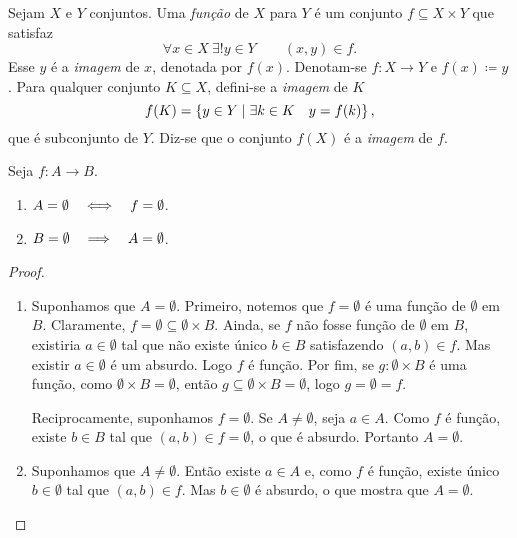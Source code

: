 \begin{defi}
Sejam $X$ e $Y$ conjuntos. Uma \emph{função} de $X$ para $Y$ é um conjunto $f \subseteq X \times Y$ que satisfaz
	\begin{equation*}
	\forall x \in X \ \exists! y \in Y \qquad (x,y) \in f.
	\end{equation*}
Esse $y$ é a \emph{imagem} de $x$, denotada por $f(x)$. Denotam-se $f: X \to Y$ e $f(x) \coloneqq y$. Para qualquer conjunto $K \subseteq X$, defini-se a \emph{imagem} de $K$
	\begin{equation*}
	f(K)=\left\{y \in Y \;\middle\vert\; \exists k \in K \quad y=f(k) \right\},
	\end{equation*}
que é subconjunto de $Y$. Diz-se que o conjunto $f(X)$ é a \emph{imagem} de $f$.
\end{defi}

\begin{prop}
	Seja $f: A \to B$.
	\begin{enumerate}
	\item $A=\emptyset \quad \Longleftrightarrow \quad f=\emptyset$.
	\item $B=\emptyset \quad \Longrightarrow \quad A=\emptyset$.
	\end{enumerate}
\end{prop}
\begin{proof}
	\begin{enumerate}
	\item Suponhamos que $A=\emptyset$. Primeiro, notemos que $f=\emptyset$ é uma função de $\emptyset$ em $B$. Claramente, $f = \emptyset \subseteq \emptyset \times B$. Ainda, se $f$ não fosse função de $\emptyset$ em $B$, existiria $a \in \emptyset$ tal que não existe único $b \in B$ satisfazendo $(a,b) \in f$. Mas existir $a \in \emptyset$ é um absurdo. Logo $f$ é função. Por fim, se $g: \emptyset \times B$ é uma função, como $\emptyset \times B = \emptyset$, então $g \subseteq \emptyset \times B = \emptyset$, logo $g=\emptyset=f$.
	
	Reciprocamente, suponhamos $f=\emptyset$. Se $A \neq \emptyset$, seja $a \in A$. Como $f$ é função, existe $b \in B$ tal que $(a,b) \in f=\emptyset$, o que é absurdo. Portanto $A=\emptyset$.
	
	\item Suponhamos que $A \neq \emptyset$. Então existe $a \in A$ e, como $f$ é função, existe único $b \in \emptyset$ tal que $(a,b) \in f$. Mas $b \in \emptyset$ é absurdo, o que mostra que $A = \emptyset$.
	\end{enumerate}
\end{proof}

